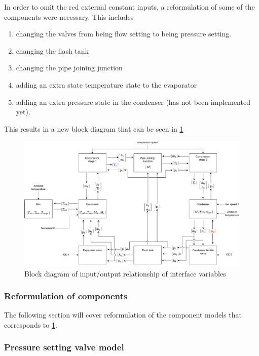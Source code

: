 In order to omit the red external constant inputs, a reformulation of some of the components were necessary. This includes
\begin{enumerate}
	\item changing the valves from being flow setting to being pressure setting.
	\item changing the flash tank
	\item changing the pipe joining junction
	\item adding an extra state temperature state to the evaporator
	\item adding an extra pressure state in the condenser (has not been implemented yet).
\end{enumerate}

This results in a new block diagram that can be seen in \cref{fig:Block_diagram_inout_valvePres}

\begin{figure}[h!]
	\centering
	\includegraphics[width=1\textwidth]{Graphics/Block_Diagram_inout.pdf}
	\caption{Block diagram of input/output relationship of interface variables}
	\label{fig:Block_diagram_inout_valvePres}
\end{figure}

\subsubsection*{\textbf{Reformulation of components}}
The following section will cover reformulation of the component models that corresponds to \cref{fig:Block_diagram_inout_valvePres}.
\subsubsection*{Pressure setting valve model}

